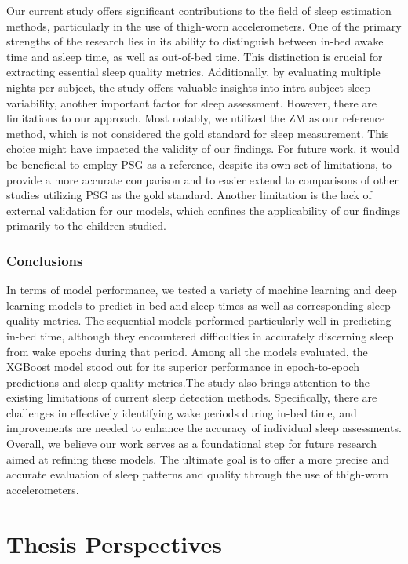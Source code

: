 \documentclass[
  10pt,
]{scrbook}
\begin{document}
Our current study offers significant contributions to the field of sleep
estimation methods, particularly in the use of thigh-worn
accelerometers. One of the primary strengths of the research lies in its
ability to distinguish between in-bed awake time and asleep time, as
well as out-of-bed time. This distinction is crucial for extracting
essential sleep quality metrics. Additionally, by evaluating multiple
nights per subject, the study offers valuable insights into
intra-subject sleep variability, another important factor for sleep
assessment. However, there are limitations to our approach. Most
notably, we utilized the ZM as our reference method, which is not
considered the gold standard for sleep measurement. This choice might
have impacted the validity of our findings. For future work, it would be
beneficial to employ PSG as a reference, despite its own set of
limitations, to provide a more accurate comparison and to easier extend
to comparisons of other studies utilizing PSG as the gold standard.
Another limitation is the lack of external validation for our models,
which confines the applicability of our findings primarily to the
children studied.

\hypertarget{conclusions-2}{%
\subsection{Conclusions}\label{conclusions-2}}

In terms of model performance, we tested a variety of machine learning
and deep learning models to predict in-bed and sleep times as well as
corresponding sleep quality metrics. The sequential models performed
particularly well in predicting in-bed time, although they encountered
difficulties in accurately discerning sleep from wake epochs during that
period. Among all the models evaluated, the XGBoost model stood out for
its superior performance in epoch-to-epoch predictions and sleep quality
metrics.The study also brings attention to the existing limitations of
current sleep detection methods. Specifically, there are challenges in
effectively identifying wake periods during in-bed time, and
improvements are needed to enhance the accuracy of individual sleep
assessments. Overall, we believe our work serves as a foundational step
for future research aimed at refining these models. The ultimate goal is
to offer a more precise and accurate evaluation of sleep patterns and
quality through the use of thigh-worn accelerometers.

\hypertarget{thesis-perspectives}{%
\chapter{Thesis Perspectives}\label{thesis-perspectives}}
\end{document}
